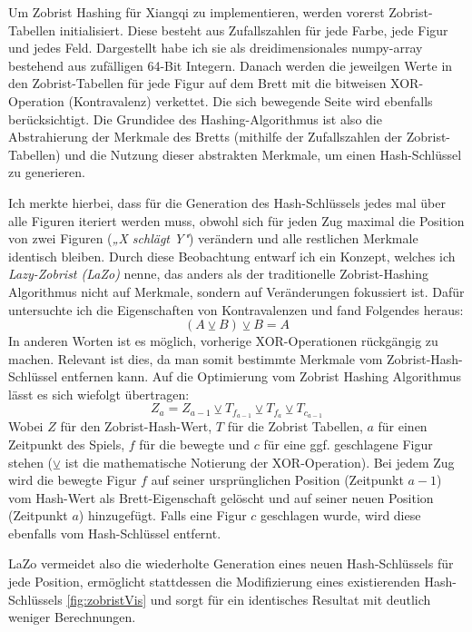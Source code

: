 \documentclass{jpp}
\begin{document}
Um Zobrist Hashing für Xiangqi zu implementieren, werden vorerst Zobrist-Tabellen initialisiert. Diese besteht aus Zufallszahlen für jede Farbe, jede Figur und jedes Feld. Dargestellt habe ich sie als dreidimensionales numpy-array bestehend aus zufälligen 64-Bit Integern. 
Danach werden die jeweilgen Werte in den Zobrist-Tabellen für jede Figur auf dem Brett mit die bitweisen XOR-Operation (Kontravalenz) verkettet. Die sich bewegende Seite wird ebenfalls berücksichtigt.
Die Grundidee des Hashing-Algorithmus ist also die Abstrahierung der Merkmale des Bretts (mithilfe der Zufallszahlen der Zobrist-Tabellen) und die Nutzung dieser abstrakten Merkmale, um einen Hash-Schlüssel zu generieren.

Ich merkte hierbei, dass für die Generation des Hash-Schlüssels jedes mal über alle Figuren iteriert werden muss, obwohl sich für jeden Zug maximal die Position von zwei Figuren (\textit{„X schlägt Y"}) verändern und alle restlichen Merkmale identisch bleiben. Durch diese Beobachtung entwarf ich ein Konzept, welches ich \textit{Lazy-Zobrist (LaZo)} nenne, das anders als der traditionelle Zobrist-Hashing Algorithmus nicht auf Merkmale, sondern auf Veränderungen fokussiert ist. 
Dafür untersuchte ich die Eigenschaften von Kontravalenzen und fand Folgendes heraus:
\begin{equation}
    (A\veebar B) \veebar B = A
\end{equation}
In anderen Worten ist es möglich, vorherige XOR-Operationen rückgängig zu machen. Relevant ist dies, da man somit bestimmte Merkmale vom Zobrist-Hash-Schlüssel entfernen kann. Auf die Optimierung vom Zobrist Hashing Algorithmus lässt es sich wiefolgt übertragen:
\begin{equation}
    Z_a = Z_{a-1} \veebar T_{f_{a-1}} \veebar T_{f_a} \veebar T_{c_{a-1}}
\end{equation}
Wobei $Z$  für den Zobrist-Hash-Wert, $T$ für die Zobrist Tabellen, $a$ für einen Zeitpunkt des Spiels, $f$ für die bewegte und $c$ für eine ggf. geschlagene Figur stehen ($\veebar$ ist die mathematische Notierung der XOR-Operation). Bei jedem Zug wird die bewegte Figur $f$ auf seiner ursprünglichen Position (Zeitpunkt $a-1$) vom Hash-Wert als Brett-Eigenschaft gelöscht und auf seiner neuen Position (Zeitpunkt $a$) hinzugefügt. Falls eine Figur $c$ geschlagen wurde, wird diese ebenfalls vom Hash-Schlüssel entfernt.

LaZo vermeidet also die wiederholte Generation eines neuen Hash-Schlüssels für jede Position, ermöglicht stattdessen die Modifizierung eines existierenden Hash-Schlüssels \ref{fig:zobristVis}  und sorgt für ein identisches Resultat mit deutlich weniger Berechnungen.
\end{document}
